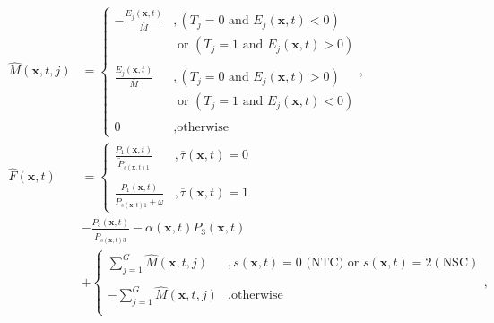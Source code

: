 \documentclass[\main/thesis.tex]{subfiles}
\begin{document}
\begin{align}
\hat{M}(\boldsymbol{x}, t, j) &{=} \begin{cases}
                                     {-}\displaystyle \frac{E_j(\boldsymbol{x}, t)}{\overline{M}} 
                                         &, (T_j = 0 \text{ and } E_j(\boldsymbol{x}, t) < 0)\\
                                         &\text{ or } (T_j = 1 \text{ and } E_j(\boldsymbol{x}, t) > 0) \\ \\
                                    \displaystyle \frac{E_j(\boldsymbol{x}, t)}{\overline{M}}
                                         &, (T_j = 0 \text{ and } E_j(\boldsymbol{x}, t) > 0)\\
                                         &\text{ or } (T_j = 1 \text{ and } E_j(\boldsymbol{x}, t) < 0) \\ \\
                                    0 &, \text{otherwise}
                                \end{cases},\label{eq:GeneExpressionRatio}\\
\hat{F}(\boldsymbol{x}, t) &{=} \begin{cases}
                            \displaystyle \frac{P_1(\boldsymbol{x}, t)}
                                               {\tilde{P}_{s(\boldsymbol{x}, t)1}} 
                              &, \overline{\tau}(\boldsymbol{x}, t) {=} 0\\
                            \\
                            \displaystyle \frac{P_1(\boldsymbol{x}, t)}
                                               {\tilde{P}_{s(\boldsymbol{x}, t)1} {+} \omega} 
                              &, \overline{\tau}(\boldsymbol{x}, t) {=} 1
                          \end{cases} \nonumber \\
                          &{-} \frac{P_3(\boldsymbol{x}, t)}{\tilde{P}_{s(\boldsymbol{x}, t)3}}
                           {-} \alpha(\boldsymbol{x}, t)P_3(\boldsymbol{x}, t)
                          \label{eq:FitnessFunc} \\
                          &{+} \begin{cases}
                                 \sum_{j{=}1}^{G} \hat{M}(\boldsymbol{x}, t, j) 
                                   &, s(\boldsymbol{x}, t) {=} 0 \text{ (NTC) or } 
                                      s(\boldsymbol{x}, t) {=} 2 (\text{NSC})\\
                                 \\
                                 {-}\sum_{j{=}1}^{G} \hat{M}(\boldsymbol{x}, t, j) 
                                   &, \text{otherwise}\\
                          \end{cases}\nonumber,
\end{align}
\end{document}
